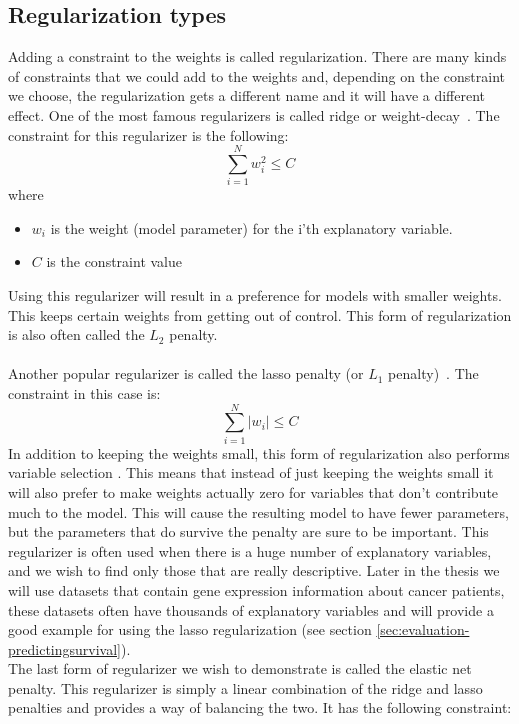 \subsection{Regularization types}
Adding a constraint to the weights is called regularization. There are many kinds of constraints that we could add to the weights and, depending on the constraint we choose, the regularization gets a different name and it will have a different effect. One of the most famous regularizers is called ridge or weight-decay~\cite{friedman2010regularization}. The constraint for this regularizer is the following:
$$
\sum_{i=1}^{N}w_{i}^{2} \leq C
$$
where
\begin{itemize}
	\item $w_{i}$ is the weight (model parameter) for the i'th explanatory variable.
	\item $C$ is the constraint value
\end{itemize}
Using this regularizer will result in a preference for models with smaller weights. This keeps certain weights from getting out of control. This form of regularization is also often called the $L_{2}$ penalty. \\ \\
\label{insec:glm-lasso}
Another popular regularizer is called the lasso penalty (or $L_{1}$ penalty)~\cite{friedman2010regularization}. The constraint in this case is:
$$
\sum_{i=1}^{N}\lvert w_{i}\rvert \leq C
$$
In addition to keeping the weights small, this form of regularization also performs variable selection \cite{tibshirani1997lasso}. This means that instead of just keeping the weights small it will also prefer to make weights actually zero for variables that don't contribute much to the model. This will cause the resulting model to have fewer parameters, but the parameters that do survive the penalty are sure to be important. This regularizer is often used when there is a huge number of explanatory variables, and we wish to find only those that are really descriptive. Later in the thesis we will use datasets that contain gene expression information about cancer patients, these datasets often have thousands of explanatory variables and will provide a good example for using the lasso regularization (see section \ref{sec:evaluation-predictingsurvival}). \\
The last form of regularizer we wish to demonstrate is called the elastic net penalty. This regularizer is simply a linear combination of the ridge and lasso penalties and provides a way of balancing the two. It has the following constraint:
